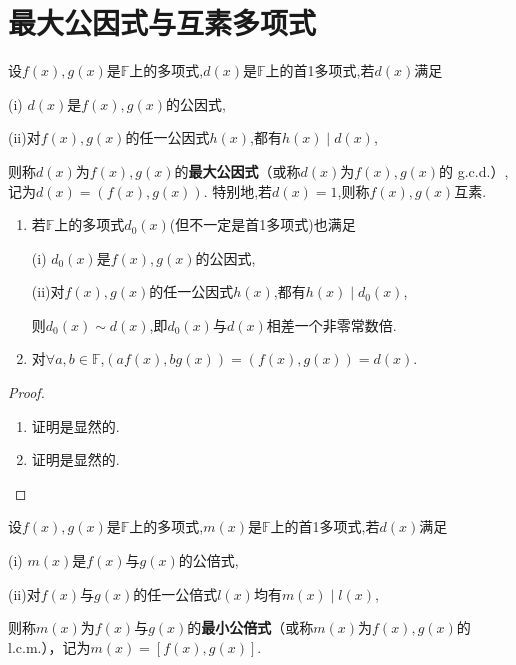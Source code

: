 \documentclass[../../main.tex]{subfiles}
\begin{document}
\section{最大公因式与互素多项式}

\begin{definition}[最大公因式和互素]\label{definition:最大公因式和互素}
设\(f(x),g(x)\)是\(\mathbb{F}\)上的多项式,$d(x)$是\(\mathbb{F}\)上的首1多项式,若\(d(x)\)满足

(i)$\,\,d(x)$是\(f(x),g(x)\)的公因式,

(ii)对\(f(x),g(x)\)的任一公因式\(h(x)\),都有\(h(x)\mid d(x)\),

则称\(d(x)\)为\(f(x),g(x)\)的\textbf{最大公因式}（或称\(d(x)\)为\(f(x),g(x)\)的 g.c.d.）,记为\(d(x)=(f(x),g(x))\).
特别地,若\(d(x)=1\),则称\(f(x),g(x)\)互素.
\end{definition}

\begin{proposition}\label{proposition:最大公因式的小结论}
\begin{enumerate}[(1)]
\item 若$\mathbb{F}$上的多项式$d_0(x)$(但不一定是首1多项式)也满足

(i)$\,\,d_0(x)$是\(f(x),g(x)\)的公因式,

(ii)对\(f(x),g(x)\)的任一公因式\(h(x)\),都有\(h(x)\mid d_0(x)\),

则$d_0(x)\sim d(x)$,即$d_0(x)$与$d(x)$相差一个非零常数倍.

\item 对$\forall a,b\in\mathbb{F}$,$(af(x),bg(x))=(f(x),g(x))=d(x)$.
\end{enumerate}
\end{proposition}
\begin{proof}
\begin{enumerate}[(1)]
\item 证明是显然的.

\item 证明是显然的.
\end{enumerate}
\end{proof}

\begin{definition}[最小公倍式]\label{definition:最小公倍式}
设\(f(x),g(x)\)是\(\mathbb{F}\)上的多项式,$m(x)$是\(\mathbb{F}\)上的首1多项式,若\(d(x)\)满足

(i)\(\,\,m(x)\)是\(f(x)\)与\(g(x)\)的公倍式,

(ii)对\(f(x)\)与\(g(x)\)的任一公倍式\(l(x)\)均有\(m(x)\mid l(x)\),

则称\(m(x)\)为\(f(x)\)与\(g(x)\)的\textbf{最小公倍式}（或称\(m(x)\)为\(f(x),g(x)\)的 l.c.m.），记为\(m(x)=[f(x),g(x)]\).
\end{definition}
\end{document}
